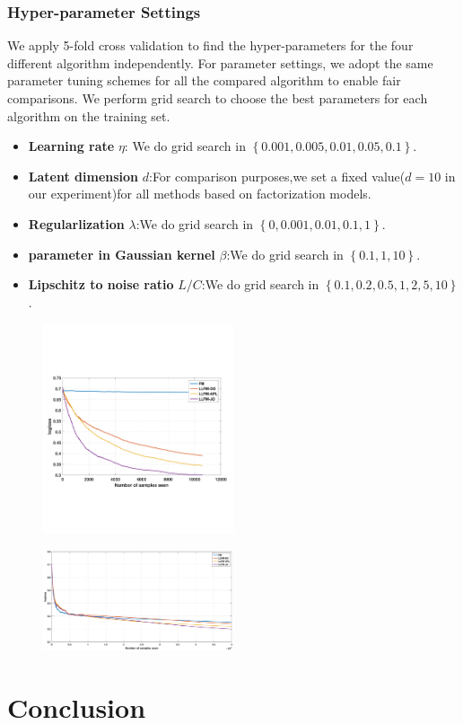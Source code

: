 \documentclass{article}
\begin{document}
\subsubsection{Hyper-parameter Settings}
We apply 5-fold cross validation to find the hyper-parameters for the four different algorithm independently. For parameter settings, we adopt the same parameter tuning schemes for all the compared algorithm to enable fair comparisons. We perform grid search to choose the best parameters for each algorithm on the training set.
\begin{itemize}
	\item \textbf{Learning rate} $\eta$: We do grid search in $\left\{0.001,0.005,0.01,0.05,0.1\right\}$.
	\item \textbf{Latent dimension} $d$:For comparison purposes,we set a fixed value($d = 10$ in our experiment)for all methods based on factorization
	models.
	\item \textbf{Regularlization} $\lambda$:We do grid search in $\left\{0,0.001,0.01,0.1,1\right\}$.
	\item \textbf{parameter in Gaussian kernel} $\beta$:We do grid search in $\left\{0.1,1,10\right\}$.
	\item \textbf{Lipschitz to noise ratio} $L/C$:We do grid search in $\left\{0.1,0.2,0.5,1,2,5,10\right\}$.
\end{itemize}
\begin{figure}[!htbp]
  \centering
    \includegraphics[width=0.5\textwidth]{Banana_learning_curve_3_sgd.pdf}
\end{figure}

\begin{figure}[!htbp]
	\centering
	\includegraphics[width=0.5\textwidth]{IJCNN_learning_curve_1_sgd.eps}
\end{figure}
\section{Conclusion}


\end{document}
